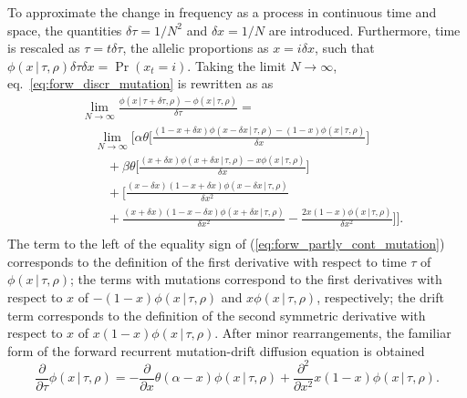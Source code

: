 \documentclass[preprint]{elsarticle}
\newcommand\given{{\,|\,}}
\newcommand\x[1]{\ensuremath{x_{#1}}}
\begin{document}

To approximate the change in frequency as a process in continuous time and space, the quantities $\delta \tau=1/N^2$ and $\delta x=1/N$ are introduced. Furthermore, time is rescaled as $\tau = t\delta \tau$, the allelic proportions as $x=i\delta x$, such that $\phi(x\given\tau,\rho)\delta \tau \delta x =
\Pr(\x{t}=i)$. Taking the limit $N\to\infty$, eq.~\eqref{eq:forw_discr_mutation} is rewritten as as
\begin{equation}\label{eq:forw_partly_cont_mutation}
\begin{split}
&\lim_{N\to\infty}
\frac{\phi(x\given \tau+\delta \tau, \rho)-\phi(x\given \tau, \rho)}{\delta \tau} =\\ 
&\quad
\lim_{N\to\infty}\bigg[
\alpha\theta \bigg[\frac{(1-x+\delta x)\phi(x-\delta x\given \tau,\rho) - (1-x)\phi(x\given\tau,\rho)}{\delta x}\bigg]\\
&\qquad+\beta\theta \bigg[\frac{(x+\delta x)\phi(x+\delta x\given\tau,\rho) - x\phi(x\given\tau,\rho)}{\delta x}\bigg]\\
&\qquad+\bigg[\frac{(x-\delta x)(1-x+\delta x)\phi(x-\delta x\given\tau,\rho)}{\delta x^2}\\
&\qquad+ \frac{(x+\delta x)(1-x-\delta x)\phi(x+\delta x\given\tau,\rho)}{\delta x^2}-\frac{2x(1-x)\phi(x\given\tau,\rho)}{\delta x^2}\bigg]
\bigg]
.\\
\end{split}
\end{equation}
The term to the left of the equality sign of (\ref{eq:forw_partly_cont_mutation}) corresponds to the definition of the first derivative with respect to time $\tau$ of $\phi(x\given\tau,\rho)$; the terms with mutations correspond to the first derivatives with respect to $x$ of $-(1-x)\phi(x\given\tau,\rho)$ and $x\phi(x\given\tau,\rho)$, respectively; the drift term corresponds to the definition of the second symmetric derivative with respect to $x$ of $x(1-x)\phi(x\given\tau,\rho)$. After minor rearrangements, the familiar form of the forward recurrent mutation-drift diffusion equation is obtained
\begin{equation}\label{eq:forw_mutdrift}
\frac{\partial}{\partial \tau} \phi(x\given\tau,\rho) = -\frac{\partial}{\partial x}\theta(\alpha-x)\phi(x\given\tau,\rho) +\frac{\partial^2}{\partial x^2}x(1-x)\phi(x\given\tau,\rho).
\end{equation}
\end{document}
